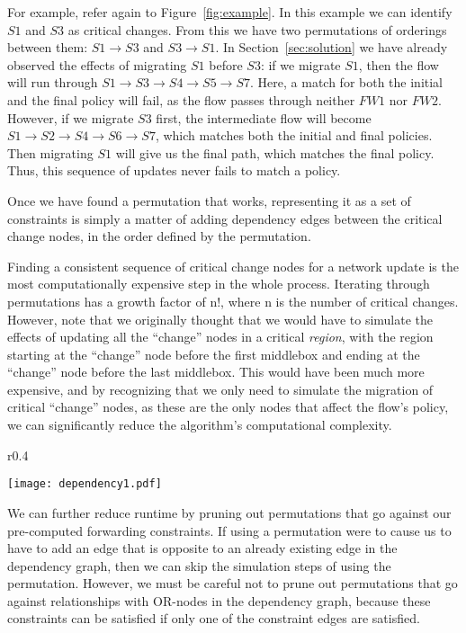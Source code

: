 \documentclass[pageno]{jpaper}
\begin{document}
For example, refer again to Figure~\ref{fig:example}. In this example we can identify $S1$ and $S3$ as critical changes. From this we have two permutations of orderings between them: $S1 \rightarrow S3$ and $S3 \rightarrow S1$. In Section~\ref{sec:solution} we have already observed the effects of migrating $S1$ before $S3$: if we migrate $S1$, then the flow will run through $S1 \rightarrow S3 \rightarrow S4 \rightarrow S5 \rightarrow S7$. Here, a match for both the initial and the final policy will fail, as the flow passes through neither $FW1$ nor $FW2$. However, if we migrate $S3$ first, the intermediate flow will become $S1 \rightarrow S2 \rightarrow S4 \rightarrow S6 \rightarrow S7$, which matches both the initial and final policies. Then migrating $S1$ will give us the final path, which matches the final policy. Thus, this sequence of updates never fails to match a policy.

Once we have found a permutation that works, representing it as a set of constraints is simply a matter of adding dependency edges between the critical change nodes, in the order defined by the permutation.

Finding a consistent sequence of critical change nodes for a network update is the most computationally expensive step in the whole process. Iterating through permutations has a growth factor of n!, where n is the number of critical changes. However, note that we originally thought that we would have to simulate the effects of updating all the ``change'' nodes in a critical \textit{region}, with the region starting at the ``change'' node before the first middlebox and ending at the ``change'' node before the last middlebox. This would have been much more expensive, and by recognizing that we only need to simulate the migration of critical ``change'' nodes, as these are the only nodes that affect the flow's policy, we can significantly reduce the algorithm's computational complexity.

\begin{wrapfigure}{r}{0.4\textwidth}
    \vspace{-10pt}
    \caption{\label{fig:dependency1}}
    \texttt{[image: dependency1.pdf]}
    \vspace{-20pt}
\end{wrapfigure}

We can further reduce runtime by pruning out permutations that go against our pre-computed forwarding constraints. If using a permutation were to cause us to have to add an edge that is opposite to an already existing edge in the dependency graph, then we can skip the simulation steps of using the permutation. However, we must be careful not to prune out permutations that go against relationships with OR-nodes in the dependency graph, because these constraints can be satisfied if only one of the constraint edges are satisfied.
\end{document}
